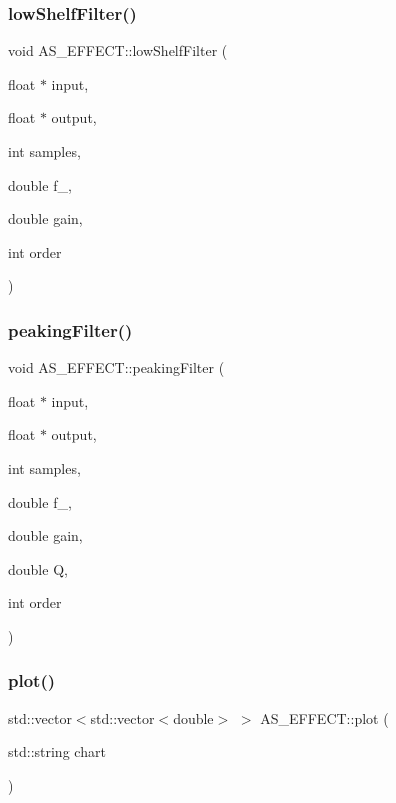\subsubsection{low\+Shelf\+Filter()}
{\footnotesize\ttfamily void A\+S\+\_\+\+E\+F\+F\+E\+C\+T\+::low\+Shelf\+Filter (\begin{DoxyParamCaption}\item[{float $\ast$}]{input,  }\item[{float $\ast$}]{output,  }\item[{int}]{samples,  }\item[{double}]{f\+\_,  }\item[{double}]{gain,  }\item[{int}]{order }\end{DoxyParamCaption})}

\mbox{\label{class_a_s___e_f_f_e_c_t_ac7d5a35837ff5fdd91f6fbb989b99c22}} 
\subsubsection{peaking\+Filter()}
{\footnotesize\ttfamily void A\+S\+\_\+\+E\+F\+F\+E\+C\+T\+::peaking\+Filter (\begin{DoxyParamCaption}\item[{float $\ast$}]{input,  }\item[{float $\ast$}]{output,  }\item[{int}]{samples,  }\item[{double}]{f\+\_,  }\item[{double}]{gain,  }\item[{double}]{Q,  }\item[{int}]{order }\end{DoxyParamCaption})}

\mbox{\label{class_a_s___e_f_f_e_c_t_a963d75afe6aa73059a8fb57e5ddd26f8}} 
\subsubsection{plot()\hspace{0.1cm}{\footnotesize\ttfamily [1/3]}}
{\footnotesize\ttfamily std\+::vector$<$std\+::vector$<$double$>$ $>$ A\+S\+\_\+\+E\+F\+F\+E\+C\+T\+::plot (\begin{DoxyParamCaption}\item[{std\+::string}]{chart }\end{DoxyParamCaption})}

